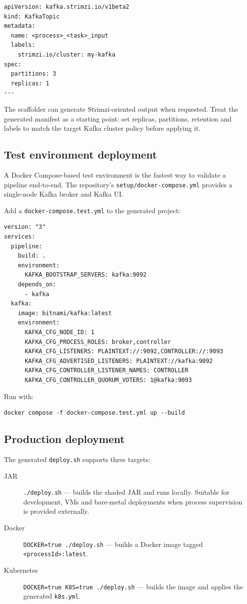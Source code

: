 \begin{verbatim}
apiVersion: kafka.strimzi.io/v1beta2
kind: KafkaTopic
metadata:
  name: <process>_<task>_input
  labels:
    strimzi.io/cluster: my-kafka
spec:
  partitions: 3
  replicas: 1
---
\end{verbatim}

The scaffolder can generate Strimzi-oriented output when requested. Treat the
generated manifest as a starting point: set replicas, partitions, retention and
labels to match the target Kafka cluster policy before applying it.

\subsection{Test environment deployment}

A Docker Compose-based test environment is the fastest way to validate a
pipeline end-to-end. The repository's \texttt{setup/docker-compose.yml}
provides a single-node Kafka broker and Kafka UI.

Add a \texttt{docker-compose.test.yml} to the generated project:

\begin{verbatim}
version: "3"
services:
  pipeline:
    build: .
    environment:
      KAFKA_BOOTSTRAP_SERVERS: kafka:9092
    depends_on:
      - kafka
  kafka:
    image: bitnami/kafka:latest
    environment:
      KAFKA_CFG_NODE_ID: 1
      KAFKA_CFG_PROCESS_ROLES: broker,controller
      KAFKA_CFG_LISTENERS: PLAINTEXT://:9092,CONTROLLER://:9093
      KAFKA_CFG_ADVERTISED_LISTENERS: PLAINTEXT://kafka:9092
      KAFKA_CFG_CONTROLLER_LISTENER_NAMES: CONTROLLER
      KAFKA_CFG_CONTROLLER_QUORUM_VOTERS: 1@kafka:9093
\end{verbatim}

Run with:
\begin{verbatim}
docker compose -f docker-compose.test.yml up --build
\end{verbatim}

\subsection{Production deployment}

The generated \texttt{deploy.sh} supports three targets:

\begin{description}
\item[JAR] \texttt{./deploy.sh} --- builds the shaded JAR and runs locally.
  Suitable for development, VMs and bare-metal deployments when process
  supervision is provided externally.
\item[Docker] \texttt{DOCKER=true ./deploy.sh} --- builds a Docker image
  tagged \texttt{<processId>:latest}.
\item[Kubernetes] \texttt{DOCKER=true K8S=true ./deploy.sh} --- builds the
  image and applies the generated \texttt{k8s.yml}.
\end{description}

